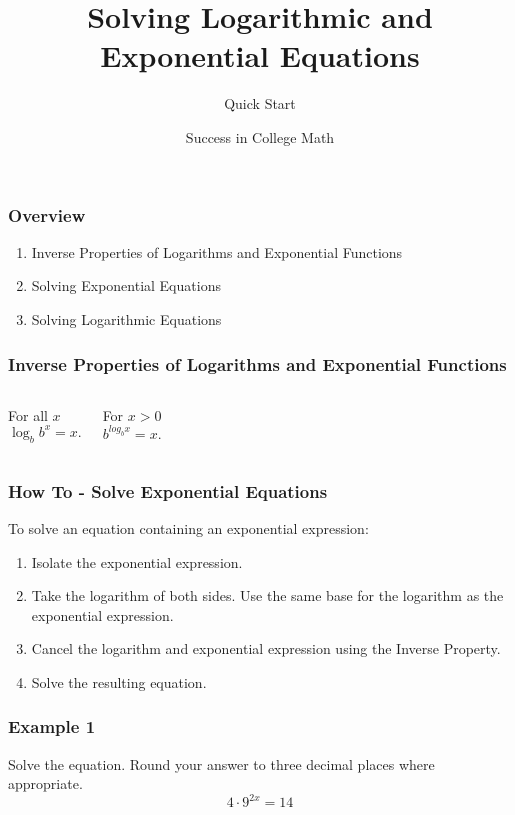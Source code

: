 \documentclass[aspectratio=169,17pt]{beamer}
\title{Solving Logarithmic and Exponential Equations}
\subtitle{Quick Start}
\author{\textsf{Success in College Math}}
\date{}
\begin{document}
\begin{frame}
	\titlepage
\end{frame}

\begin{frame}
	\frametitle{Overview}
	\pause
	\begin{enumerate}
		\item Inverse Properties of Logarithms and Exponential Functions \pause
		\item Solving Exponential Equations \pause
		\item Solving Logarithmic Equations
	\end{enumerate}
\end{frame}

\begin{frame}
	\frametitle{Inverse Properties of Logarithms and Exponential Functions}
	\begin{columns}
		For all $x$
		$$\log_b{b^x} = x.$$

		For $x > 0$
		$$b^{log_b{x}} = x.$$
	\end{columns}
\end{frame}

\begin{frame}
	\frametitle{How To - Solve Exponential Equations}
	To solve an equation containing an exponential expression: \pause
	\begin{enumerate}
		\item Isolate the exponential expression. \pause
		\item Take the logarithm of both sides. Use the same base for the logarithm as the exponential expression. \pause
		\item Cancel the logarithm and exponential expression using the Inverse Property. \pause
		\item Solve the resulting equation.
	\end{enumerate}
\end{frame}

\begin{frame}[t]
	\frametitle{Example 1}
	Solve the equation. Round your answer to three decimal places where appropriate.
	$$4 \cdot 9^{2x} = 14$$
\end{frame}
\end{document}
